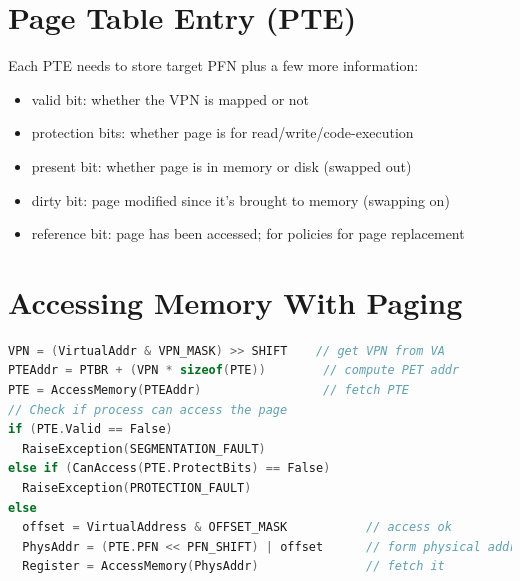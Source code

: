 \section*{Page Table Entry (PTE)}
Each PTE needs to store target PFN plus a few more information:
\begin{itemize}
\item valid bit: whether the VPN is mapped or not
\item protection bits: whether page is for read/write/code-execution
\item present bit: whether page is in memory or disk (swapped out)
\item dirty bit: page modified since it's brought to memory (swapping on)
\item reference bit: page has been accessed; for policies for page replacement
\end{itemize}
\section*{Accessing Memory With Paging}
\begin{lstlisting}[language=c]
VPN = (VirtualAddr & VPN_MASK) >> SHIFT    // get VPN from VA
PTEAddr = PTBR + (VPN * sizeof(PTE))        // compute PET addr
PTE = AccessMemory(PTEAddr)                 // fetch PTE
// Check if process can access the page
if (PTE.Valid == False)
  RaiseException(SEGMENTATION_FAULT)
else if (CanAccess(PTE.ProtectBits) == False)
  RaiseException(PROTECTION_FAULT)
else
  offset = VirtualAddress & OFFSET_MASK           // access ok
  PhysAddr = (PTE.PFN << PFN_SHIFT) | offset      // form physical addr
  Register = AccessMemory(PhysAddr)               // fetch it
\end{lstlisting}
